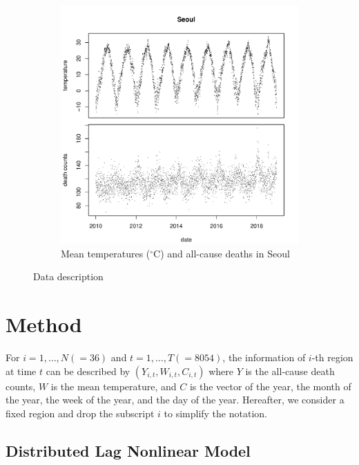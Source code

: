 \documentclass[12pt]{article}
\begin{document}
\begin{figure}
\begin{subfigure}[b]{0.5\textwidth}
		\includegraphics[width = \textwidth]{figures/temporal-trend.pdf}
		\caption{Mean temperatures ($^\circ$C) and all-cause deaths in Seoul}
		\label{fig:temporal-trend}
	\end{subfigure}
	\caption{Data description}
	\label{fig:data}
\end{figure}


\section{Method} 
\label{section:method}

For $i = 1, \dots, N(=36)$ and $t = 1, \dots, T(=8054)$, 
the information of $i$-th region at time $t$ can be described by $(Y_{i,t}, W_{i,t}, C_{i,t})$ 
where $Y$ is the all-cause death counts, $W$ is the mean temperature, 
and $C$ is the vector of the year, the month of the year, the week of the year, and the day of the year.
Hereafter, we consider a fixed region and drop the subscript $i$ to simplify the notation.


\subsection{Distributed Lag Nonlinear Model}
\label{section:dlnm}
\end{document}
